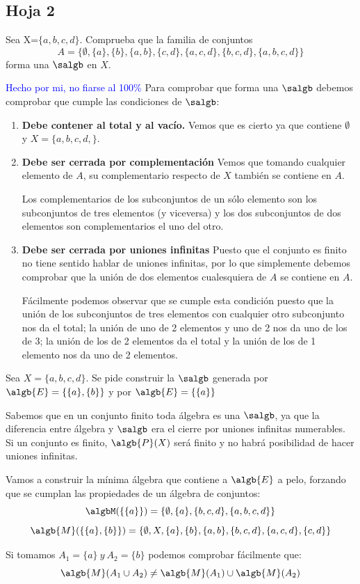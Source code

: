 \subsection{Hoja 2}
\begin{problem}[1]
Sea X=$\{a,b,c,d\}$. Comprueba que la familia de conjuntos
\[A = \{\emptyset, \{a\}, \{b\}, \{a,b\},\{c,d\},\{a,c,d\},\{b,c,d\}, \{a,b,c,d\}\}\]
forma una $\salgb$ en $X$.

\solution
\textcolor{blue}{Hecho por mi, no fiarse al 100\%}
Para comprobar que forma una $\salgb$ debemos comprobar que cumple las condiciones de $\salgb$:

\begin{enumerate}
\item \textbf{Debe contener al total y al vacío.}
Vemos que es cierto ya que contiene $\emptyset$ y $X=\{a,b,c,d,\}$.

\item \textbf{Debe ser cerrada por complementación}
Vemos que tomando cualquier elemento de $A$, su complementario respecto de $X$ también se contiene en $A$.

Los complementarios de los subconjuntos de un sólo elemento son los subconjuntos de tres elementos (y viceversa) y los dos subconjuntos de dos elementos son complementarios el uno del otro.

\item \textbf{Debe ser cerrada por uniones infinitas}
Puesto que el conjunto es finito no tiene sentido hablar de uniones infinitas, por lo que simplemente debemos comprobar que la unión de dos elementos cualesquiera de $A$ se contiene en $A$.

Fácilmente podemos observar que se cumple esta condición puesto que la unión de los subconjuntos de tres elementos con cualquier otro subconjunto nos da el total; la unión de uno de 2 elementos y uno de 2 nos da uno de los de 3; la unión de los de 2 elementos da el total y la unión de los de 1 elemento nos da uno de 2 elementos.
\end{enumerate}

\end{problem}
\begin{problem}[2]
Sea $X=\{a,b,c,d\}$. Se pide construir la $\salgb$ generada por $\algb{E}=\{\{a\},\{b\}\}$ y por $\algb{E}=\{\{a\}\}$

\solution
Sabemos que en un conjunto finito toda álgebra es una $\salgb$, ya que la diferencia entre álgebra y $\salgb$ era el cierre por uniones infinitas numerables. Si un conjunto es finito, $\algb{P}(X)$ será finito y no habrá posibilidad de hacer uniones infinitas.

Vamos a construir la mínima álgebra que contiene a $\algb{E}$ a pelo, forzando que se cumplan las propiedades de un álgebra de conjuntos:
\[\algbM(\{\{a\}\}) = \{\emptyset, \{a\}, \{b,c,d\}, \{a,b,c,d\}\}\]
\[\algb{M}(\{\{a\},\{b\}\})=\{\emptyset, X, \{a\}, \{b\}, \{a,b\}, \{b,c,d\}, \{a,c,d\}, \{c,d\}\}\]

\obs Si tomamos $A_1=\{a\} \ y \ A_2 = \{b\}$ podemos comprobar fácilmente que:
\[\algb{M}(A_1 \cup A_2) \neq \algb{M}(A_1) \cup \algb{M}(A_2)\]
\end{problem}

